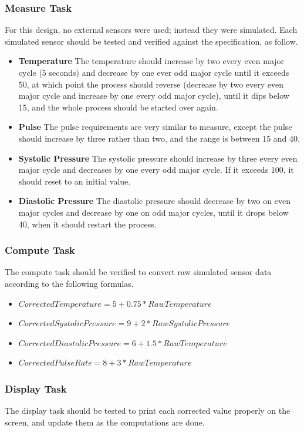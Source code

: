 \documentclass[12pt]{article} %
\begin{document}
\subsubsection{Measure Task}
For this design, no external sensors were used; instead they were simulated.  Each simulated sensor should be tested and verified against the specification, as follow.
\begin{itemize}
  \item \textbf{Temperature} The temperature should increase by two every even major cycle (5 seconds) and decrease by one ever odd major cycle until it exceeds 50, at which point the process should reverse (decrease by two every even major cycle and increase by one every odd major cycle), until it dips below 15, and the whole process should be started over again.  
  \item \textbf{Pulse} The pulse requirements are very similar to measure, except the pulse should increase by three rather than two, and the range is between 15 and 40.
  \item \textbf{Systolic Pressure} The systolic pressure should increase by three every even major cycle and decreases by one every odd major cycle.  If it exceeds 100, it should reset to an initial value.
  \item \textbf{Diastolic Pressure} The diastolic pressure should decrease by two on even major cycles and decrease by one on odd major cycles, until it drops below 40, when it should restart the process.
\end{itemize}

\subsubsection{Compute Task}
The compute task should be verified to convert raw simulated sensor data according to the following formulas.
\begin{itemize}
  \item $CorrectedTemperature = 5 + 0.75 * RawTemperature$
  \item $CorrectedSystolicPressure = 9 + 2 * RawSystolicPressure$
  \item $CorrectedDiastolicPressure = 6 + 1.5 * RawTemperature$
  \item $CorrectedPulseRate = 8 + 3 * RawTemperature$
\end{itemize}

\subsubsection{Display Task}
The display task should be tested to print each corrected value properly on the screen, and update them as the computations are done.
\end{document}
